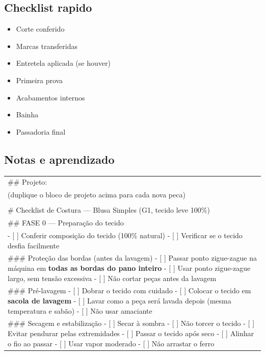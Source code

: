\documentclass[
  brazilian,
  8pt,
  oneside]{book}
\providecommand{\tightlist}{%
  \setlength{\itemsep}{0pt}\setlength{\parskip}{0pt}}
\begin{document}
\bigskip
{}

\bigskip
{}

\subsection{Checklist rapido}\label{checklist-rapido}

\begin{itemize}
\tightlist
\item[$\square$]
  Corte conferido
\item[$\square$]
  Marcas transferidas
\item[$\square$]
  Entretela aplicada (se houver)
\item[$\square$]
  Primeira prova
\item[$\square$]
  Acabamentos internos
\item[$\square$]
  Bainha
\item[$\square$]
  Passadoria final
\end{itemize}

\subsection{Notas e aprendizado}\label{notas-e-aprendizado}


\bigskip
{}

\begin{longtable}[]{@{}
  >{\raggedright\arraybackslash}p{}@{}}
\toprule\noalign{}
\endhead
\bottomrule\noalign{}
\endlastfoot
\#\# Projeto: \\
(duplique o bloco de projeto acima para cada nova peca) \\
\newpage \\
\# Checklist de Costura --- Blusa Simples (G1, tecido leve 100\%) \\
\#\# FASE 0 --- Preparação do tecido \\
- {[} {]} Conferir composição do tecido (100\% natural)
- {[} {]} Verificar se o tecido desfia facilmente \\
\#\#\# Proteção das bordas (antes da lavagem)
- {[} {]} Passar ponto zigue-zague na máquina em \textbf{todas as bordas do pano inteiro}
- {[} {]} Usar ponto zigue-zague largo, sem tensão excessiva
- {[} {]} Não cortar peças antes da lavagem \\
\#\#\# Pré-lavagem
- {[} {]} Dobrar o tecido com cuidado
- {[} {]} Colocar o tecido em \textbf{sacola de lavagem}
- {[} {]} Lavar como a peça será lavada depois (mesma temperatura e sabão)
- {[} {]} Não usar amaciante \\
\#\#\# Secagem e estabilização
- {[} {]} Secar à sombra
- {[} {]} Não torcer o tecido
- {[} {]} Evitar pendurar pelas extremidades
- {[} {]} Passar o tecido após seco
- {[} {]} Alinhar o fio ao passar
- {[} {]} Usar vapor moderado
- {[} {]} Não arrastar o ferro \\
\end{longtable}
\end{document}
